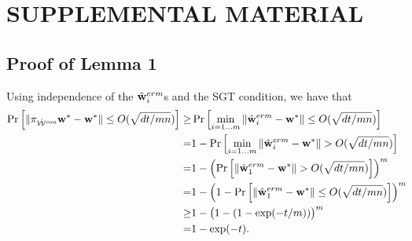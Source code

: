 \documentclass[thesis.tex]{subfiles}
\begin{document}




\clearpage

\section*{SUPPLEMENTAL MATERIAL}
\subsection*{Proof of Lemma 1}
Using independence of the $\hat{\mathbf w}^{erm}_i$s and the SGT condition, we have that
\begin{align}
    \Pr\left[{{\lVert {\pi_{{{\hat {{\mathcal W}}^{\textit{owa}}}}}{\mathbf w^{*}}-{\mathbf w^{*}}} \rVert} \le O(\sqrt{dt/mn})}\right]
\ge &
\Pr\left[{\min_{i=1...m} {\lVert {\hat{\mathbf w}^{erm}_i-{\mathbf w^{*}}} \rVert} \le O(\sqrt{dt/mn})}\right]
\\
=&
1-\Pr\left[{\min_{i=1...m} {\lVert {\hat{\mathbf w}^{erm}_i-{\mathbf w^{*}}} \rVert} > O(\sqrt{dt/mn})}\right]
\\
= &
1-\left(\Pr\left[{{\lVert {\hat{\mathbf w}^{erm}_1-{\mathbf w^{*}}} \rVert} > O(\sqrt{dt/mn})}\right]\right)^m
\\
= &
1-\left(1-\Pr\left[{{\lVert {\hat{\mathbf w}^{erm}_1-{\mathbf w^{*}}} \rVert} \le O(\sqrt{dt/mn})}\right]\right)^m\!\!\!
\\
\ge &
1-\big(1-(1-\exp(-t/m))\big)^m
\\
= &
1-\exp(-t)
\label{eq:lemres}
.
\end{align}
\end{document}
